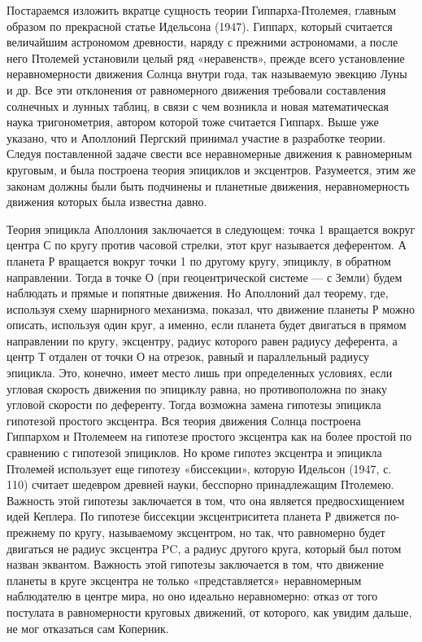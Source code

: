 Постараемся  изложить   вкратце  сущность   теории  Гиппарха-Птолемея,
главным  образом  по  прекрасной  статье  Идельсона  (1947).  Гиппарх,
который считается  величайшим астрономом древности, наряду  с прежними
астрономами, а после него  Птолемей установили целый ряд «неравенств»,
прежде  всего  установление  неравномерности  движения  Солнца  внутри
года,  так  называемую  эвекцию  Луны  и др.  Все  эти  отклонения  от
равномерного движения требовали составления солнечных и лунных таблиц,
в связи  с чем  возникла и  новая математическая  наука тригонометрия,
автором  которой  тоже считается  Гиппарх.  Выше  уже указано,  что  и
Аполлоний  Пергский  принимал  участие  в  разработке  теории.  Следуя
поставленной задаче  свести все  неравномерные движения  к равномерным
круговым, и была построена  теория эпициклов и эксцентров. Разумеется,
этим  же законам  должны  были быть  подчинены  и планетные  движения,
неравномерность движения которых была известна давно.

Теория эпицикла  Аполлония заключается в следующем:  точка 1 вращается
вокруг центра С по кругу  против часовой стрелки, этот круг называется
деферентом. А  планета Р  вращается вокруг точки  1 по  другому кругу,
эпициклу, в обратном направлении. Тогда в точке О (при геоцентрической
системе --- с Земли) будем наблюдать  и прямые и попятные движения. Но
Аполлоний  дал теорему,  где,  используя  схему шарнирного  механизма,
показал, что движение планеты Р  можно описать, используя один круг, а
именно, если  планета будет двигаться  в прямом направлении  по кругу,
эксцентру, радиус которого равен радиусу  деферента, а центр Т отдален
от точки  О на отрезок,  равный и параллельный радиусу  эпицикла. Это,
конечно,  имеет место  лишь  при определенных  условиях, если  угловая
скорость  движения  по  эпициклу  равна, но  противоположна  по  знаку
угловой скорости по деференту. Тогда возможна замена гипотезы эпицикла
гипотезой  простого эксцентра.  Вся теория  движения Солнца  построена
Гиппархом  и Птолемеем  на гипотезе  простого эксцентра  как на  более
простой по сравнению с гипотезой эпициклов. Но кроме гипотез эксцентра
и  эпицикла  Птолемей  использует еще  гипотезу  «биссекции»,  которую
Идельсон  (1947, с.  110)  считает шедевром  древней науки,  бесспорно
принадлежащим Птолемею. Важность этой  гипотезы заключается в том, что
она  является  предвосхищением  идей Кеплера.  По  гипотезе  биссекции
эксцентриситета планета  Р движется по-прежнему по  кругу, называемому
эксцентром, но так, что равномерно будет двигаться не радиус эксцентра
PC,  а  радиус  другого  круга, который  был  потом  назван  эквантом.
Важность этой гипотезы заключается в том, что движение планеты в круге
эксцентра  не  только  «представляется»  неравномерным  наблюдателю  в
центре мира, но  оно идеально неравномерно: отказ от  того постулата в
равномерности круговых  движений, от  которого, как увидим  дальше, не
мог отказаться сам Коперник.


